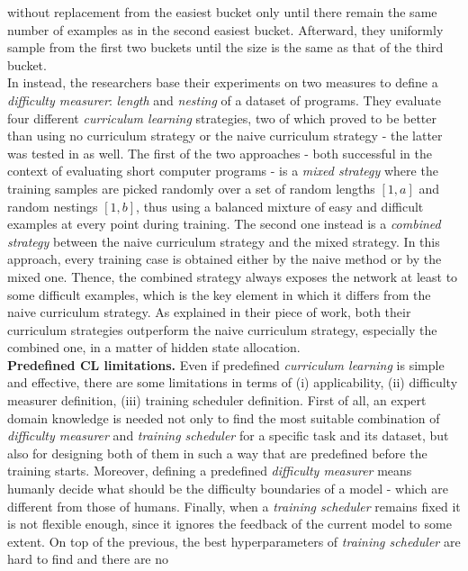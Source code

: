 without replacement from the easiest bucket only until there remain the same number of 
examples as in the second easiest bucket. Afterward, they uniformly sample 
from the first two buckets until the size is the same as that of the third bucket.\\
In \cite{zaremba2014learning} instead, the researchers base their experiments on two measures to 
define a \textit{difficulty measurer}: \textit{length} and \textit{nesting} of a dataset of programs.
They evaluate four different \textit{curriculum learning} strategies, two of which proved to be better than using no curriculum strategy or the 
naive curriculum strategy - the latter was tested in \cite{bengio2009curriculum} as well.
The first of the two approaches - both successful in the context of evaluating 
short computer programs - is a \textit{mixed strategy} where the training samples
are picked randomly over a set of random lengths \([1, a]\) and random nestings \([1, b]\),
thus using a balanced mixture of easy and difficult examples at every point during training.
The second one instead is a \textit{combined strategy} between the naive curriculum strategy 
and the mixed strategy. In this approach, every training case is obtained 
either by the naive method or by the mixed one. 
Thence, the combined strategy always exposes the network at least to some difficult examples, which is the key element 
in which it differs from the naive curriculum strategy. As explained in their 
piece of work, both their curriculum strategies outperform the naive curriculum strategy, especially 
the combined one, in a matter of hidden state allocation.\\
\textbf{Predefined CL limitations.} Even if predefined \textit{curriculum learning} is simple and effective, there are 
some limitations in terms of (i) applicability, (ii) difficulty measurer definition, (iii) training scheduler definition.
First of all, an expert domain knowledge is needed not only to find the most suitable
combination of \textit{difficulty measurer} and \textit{training scheduler} for a specific task and its dataset, 
but also for designing both of them in such a way that are predefined before the training starts.
Moreover, defining a predefined \textit{difficulty measurer} means humanly decide what should be the difficulty boundaries of a model - which are
different from those of humans. Finally, when a \textit{training scheduler} remains fixed 
it is not flexible enough, since it ignores the feedback of the current model to some extent.
On top of the previous, the best hyperparameters of \textit{training scheduler} are hard to find and there are no 
